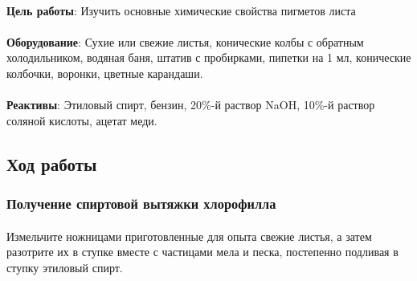 
\begin{footnotesize}

\paragraph*{}\textbf{Цель работы}: Изучить основные химические свойства пигметов листа

\paragraph*{}\textbf{Оборудование}: Сухие или свежие листья, конические колбы с обратным холодильником, водяная баня, штатив с пробирками, пипетки на 1 мл, конические колбочки, воронки, цветные карандаши.

\paragraph*{}\textbf{Реактивы}: Этиловый спирт, бензин, 20\%-й раствор NaOH, 10\%-й раствор соляной кислоты, ацетат меди.

\end{footnotesize}

\subsection*{Ход работы}

\subsubsection*{Получение спиртовой вытяжки хлорофилла}

\paragraph*{}Измельчите ножницами приготовленные для опыта свежие листья, а затем разотрите их в ступке вместе с частицами мела и песка, постепенно подливая в ступку этиловый спирт. 

